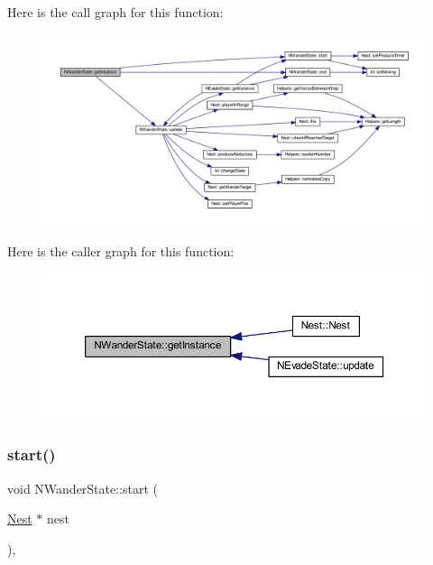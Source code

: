 Here is the call graph for this function\+:
\nopagebreak
\begin{figure}[H]
\begin{center}
\leavevmode
\includegraphics[width=350pt]{class_n_wander_state_a7e705fdb77af73c5dd8cfc8801f1a8ec_cgraph}
\end{center}
\end{figure}
Here is the caller graph for this function\+:
\nopagebreak
\begin{figure}[H]
\begin{center}
\leavevmode
\includegraphics[width=350pt]{class_n_wander_state_a7e705fdb77af73c5dd8cfc8801f1a8ec_icgraph}
\end{center}
\end{figure}
\mbox{\label{class_n_wander_state_a8f0f059e756935283e903fa4647a7c3d}} 
\subsubsection{\texorpdfstring{start()}{start()}}
{\footnotesize\ttfamily void N\+Wander\+State\+::start (\begin{DoxyParamCaption}\item[{\hyperlink{class_nest}{Nest} $\ast$}]{nest }\end{DoxyParamCaption})\hspace{0.3cm}{\ttfamily [override]}, {\ttfamily [virtual]}}



